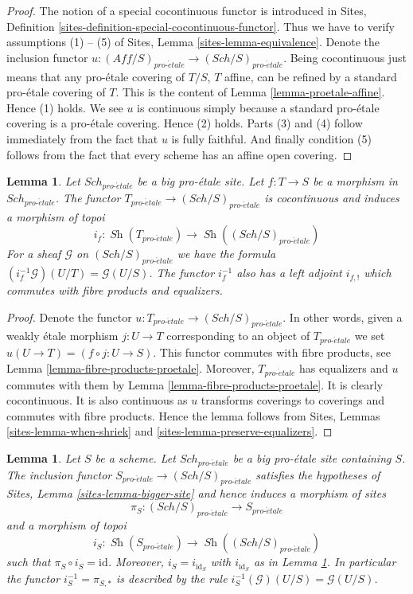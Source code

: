 \documentclass{stacks-project}
\theoremstyle{plain}
\newtheorem{lemma}[subsection]{Lemma}
\theoremstyle{definition}
\theoremstyle{remark}
\numberwithin{equation}{subsection}
\def\Sch{\mathit{Sch}}
\def\Sh{\mathop{\mathit{Sh}}\nolimits}
\def\proetale{{pro\text{-}\acute{e}tale}}
\begin{document}
\begin{proof}
The notion of a special cocontinuous functor is introduced in
Sites, Definition \ref{sites-definition-special-cocontinuous-functor}.
Thus we have to verify assumptions (1) -- (5) of
Sites, Lemma \ref{sites-lemma-equivalence}.
Denote the inclusion functor
$u : (\textit{Aff}/S)_\proetale \to (\Sch/S)_\proetale$.
Being cocontinuous just means that any pro-\'etale covering of
$T/S$, $T$ affine, can be refined by a standard pro-\'etale
covering of $T$. This is the content of
Lemma \ref{lemma-proetale-affine}.
Hence (1) holds. We see $u$ is continuous simply because a standard
pro-\'etale covering is a pro-\'etale covering. Hence (2) holds.
Parts (3) and (4) follow immediately from the fact that $u$ is
fully faithful. And finally condition (5) follows from the
fact that every scheme has an affine open covering.
\end{proof}

\begin{lemma}
\label{lemma-put-in-T}
Let $\Sch_\proetale$ be a big pro-\'etale site.
Let $f : T \to S$ be a morphism in $\Sch_\proetale$.
The functor $T_\proetale \to (\Sch/S)_\proetale$
is cocontinuous and induces a morphism of topoi
$$
i_f :
\Sh(T_\proetale)
\longrightarrow
\Sh((\Sch/S)_\proetale)
$$
For a sheaf $\mathcal{G}$ on $(\Sch/S)_\proetale$
we have the formula $(i_f^{-1}\mathcal{G})(U/T) = \mathcal{G}(U/S)$.
The functor $i_f^{-1}$ also has a left adjoint $i_{f, !}$ which commutes
with fibre products and equalizers.
\end{lemma}

\begin{proof}
Denote the functor $u : T_\proetale \to (\Sch/S)_\proetale$.
In other words, given a weakly \'etale morphism $j : U \to T$ corresponding
to an object of $T_\proetale$ we set $u(U \to T) = (f \circ j : U \to S)$.
This functor commutes with fibre products, see
Lemma \ref{lemma-fibre-products-proetale}.
Moreover, $T_\proetale$ has equalizers and $u$ commutes with them
by Lemma \ref{lemma-fibre-products-proetale}.
It is clearly cocontinuous.
It is also continuous as $u$ transforms coverings to coverings and
commutes with fibre products. Hence the lemma follows from
Sites, Lemmas \ref{sites-lemma-when-shriek}
and \ref{sites-lemma-preserve-equalizers}.
\end{proof}

\begin{lemma}
\label{lemma-at-the-bottom}
Let $S$ be a scheme. Let $\Sch_\proetale$ be a big pro-\'etale
site containing $S$.
The inclusion functor $S_\proetale \to (\Sch/S)_\proetale$
satisfies the hypotheses of Sites, Lemma \ref{sites-lemma-bigger-site}
and hence induces a morphism of sites
$$
\pi_S : (\Sch/S)_\proetale \longrightarrow S_\proetale
$$
and a morphism of topoi
$$
i_S : \Sh(S_\proetale) \longrightarrow \Sh((\Sch/S)_\proetale)
$$
such that $\pi_S \circ i_S = \text{id}$. Moreover, $i_S = i_{\text{id}_S}$
with $i_{\text{id}_S}$ as in Lemma \ref{lemma-put-in-T}. In particular the
functor $i_S^{-1} = \pi_{S, *}$ is described by the rule
$i_S^{-1}(\mathcal{G})(U/S) = \mathcal{G}(U/S)$.
\end{lemma}
\end{document}
